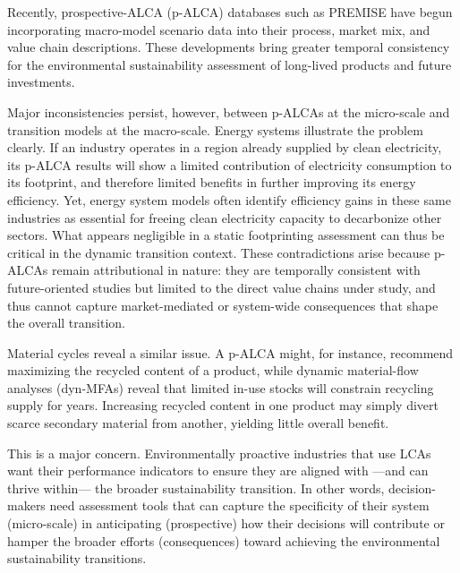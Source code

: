 \documentclass[compact]{nserc} %
\begin{document}
\begin{markdown}
Recently, prospective-ALCA (p-ALCA) databases such as PREMISE have begun incorporating macro-model scenario data into their process, market mix, and value chain descriptions. These developments bring greater temporal consistency for the environmental sustainability assessment of long-lived products and future investments.

Major inconsistencies persist, however, between p-ALCAs at the micro-scale and transition models at the macro-scale. Energy systems illustrate the problem clearly. If an industry operates in a region already supplied by clean electricity, its p-ALCA results will show a limited contribution of electricity consumption to its footprint, and therefore limited benefits in further improving its energy efficiency. Yet, energy system models often identify efficiency gains in these same industries as essential for freeing clean electricity capacity to decarbonize other sectors. What appears negligible in a static footprinting assessment can thus be critical in the dynamic transition context. These contradictions arise because p-ALCAs remain attributional in nature: they are temporally consistent with future-oriented studies but limited to the direct value chains under study, and thus cannot capture market-mediated or system-wide consequences that shape the overall transition.

Material cycles reveal a similar issue. A p-ALCA might, for instance, recommend maximizing the recycled content of a product, while dynamic material-flow analyses (dyn-MFAs) reveal that limited in-use stocks will constrain recycling supply for years. Increasing recycled content in one product may simply divert scarce secondary material from another, yielding little overall benefit.%

This is a major concern. Environmentally proactive industries that use LCAs want their performance indicators to ensure they are aligned with ---and can thrive within--- the broader sustainability transition. In other words, decision-makers need assessment tools that can capture the specificity of their system (micro-scale) in anticipating (prospective) how their decisions will contribute or hamper the broader efforts (consequences) toward achieving the environmental sustainability transitions.


\end{markdown}
\end{document}
